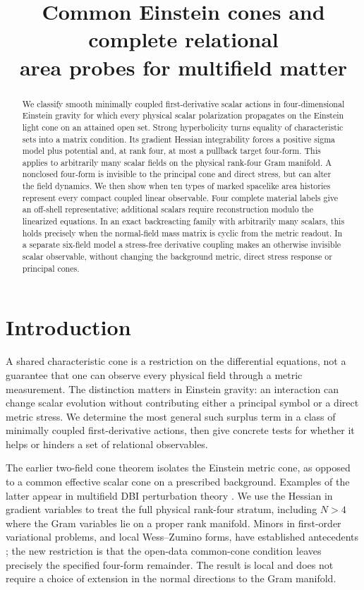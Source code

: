 \documentclass[11pt]{article}
\title{Common Einstein cones and complete relational\\area probes for multifield matter}
\author{}
\date{}
\begin{document}
\maketitle
\begin{abstract}
We classify smooth minimally coupled first-derivative scalar actions in four-dimensional Einstein gravity for which every physical scalar polarization propagates on the Einstein light cone on an attained open set. Strong hyperbolicity turns equality of characteristic sets into a matrix condition. Its gradient Hessian integrability forces a positive sigma model plus potential and, at rank four, at most a pullback target four-form. This applies to arbitrarily many scalar fields on the physical rank-four Gram manifold. A nonclosed four-form is invisible to the principal cone and direct stress, but can alter the field dynamics. We then show when ten types of marked spacelike area histories represent every compact coupled linear observable. Four complete material labels give an off-shell representative; additional scalars require reconstruction modulo the linearized equations. In an exact backreacting family with arbitrarily many scalars, this holds precisely when the normal-field mass matrix is cyclic from the metric readout. In a separate six-field model a stress-free derivative coupling makes an otherwise invisible scalar observable, without changing the background metric, direct stress response or principal cones.
\end{abstract}

\section{Introduction}
A shared characteristic cone is a restriction on the differential equations, not a guarantee that one can observe every physical field through a metric measurement. The distinction matters in Einstein gravity: an interaction can change scalar evolution without contributing either a principal symbol or a direct metric stress. We determine the most general such surplus term in a class of minimally coupled first-derivative actions, then give concrete tests for whether it helps or hinders a set of relational observables.

The earlier two-field cone theorem \cite{P46} isolates the Einstein metric cone, as opposed to a common effective scalar cone on a prescribed background. Examples of the latter appear in multifield DBI perturbation theory \cite{Langlois}. We use the Hessian in gradient variables to treat the full physical rank-four stratum, including \(N>4\) where the Gram variables lie on a proper rank manifold. Minors in first-order variational problems, and local Wess--Zumino forms, have established antecedents \cite{BCO,OS,DG}; the new restriction is that the open-data common-cone condition leaves precisely the specified four-form remainder. The result is local and does not require a choice of extension in the normal directions to the Gram manifold.
\end{document}
